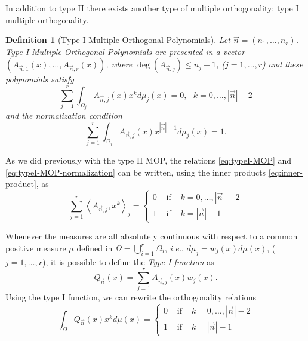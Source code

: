 \documentclass[12pt,a4]{article}
\theoremstyle{plain}
\newtheorem{definition}[theorem]{Definition}
\newcommand{\prodesc}[2]{\left\langle #1 , #2 \right\rangle}
\begin{document}
In addition to type II there exists another type of multiple orthogonality: type I multiple orthogonality.

\begin{definition}[Type I Multiple Orthogonal Polynomials]
    \label{def:typeI-univar}
    Let $\vec n = (n_1,\dots,n_r)$. Type I Multiple Orthogonal Polynomials are presented in a vector $(A_{\vec n, 1}(x), \dots, A_{\vec n, r}(x))$, where $\deg(A_{\vec n, j})\leq n_j-1$, ($j=1,\dots,r$) and these polynomials satisfy
    \begin{equation}
        \label{eq:typeI-MOP}
        \sum_{j=1}^r \int_{\Omega_j}A_{\vec n, j}(x) x^k d\mu_j(x) = 0,  \ \ \ k=0,\dots,|\vec n|-2
    \end{equation}
    and the normalization condition
    \begin{equation}
        \label{eq:typeI-MOP-normalization}
        \sum_{j=1}^r \int_{\Omega_j}A_{\vec n, j}(x) x^{|\vec n|-1} d\mu_j(x) = 1.
    \end{equation}
    
\end{definition}

As we did previously with the type II MOP, the relations \eqref{eq:typeI-MOP} and \eqref{eq:typeI-MOP-normalization} can be written, using the inner products \eqref{eq:inner-product}, as
\begin{equation}
    \label{eq:typeI-MOP-dot}
    \sum_{j=1}^r \prodesc{A_{\vec n,j}}{x^k}_j = \left\{\begin{array}{ccl}
        0 &   \text{ if } & k=0,\dots,|\vec n|-2 \\
        1 & \text{ if } & k=|\vec n|-1      
    \end{array}\right.
\end{equation}

Whenever the measures are all absolutely continuous with respect to a common positive measure $\mu$ defined in $\Omega = \displaystyle\bigcup_{i=1}^r \Omega_i$, \textit{i.e.}, $d\mu_j = w_j(x) d\mu(x)$, ($j=1,\dots,r$), it is possible to define the \textit{Type I function} as
\begin{equation}
    \label{eq:typeI-function}
    Q_{\vec n}(x)=\sum_{j=1}^r A_{\vec n,j}(x)w_j(x).
\end{equation}
Using the type I function, we can rewrite the orthogonality relations
\begin{equation}
    \label{eq:typeI-MOP-function}
    \int_\Omega Q_{\vec n}(x) x^k d\mu(x) = \left\{\begin{array}{ccl}
        0 &   \text{ if } & k=0,\dots,|\vec n|-2 \\
        1 & \text{ if } & k=|\vec n|-1      
    \end{array}\right.
\end{equation}
\end{document}
